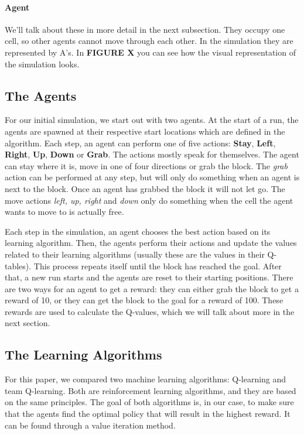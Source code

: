 \paragraph{Agent}
We'll talk about these in more detail in the next subsection. They occupy one cell, so other agents cannot move through each other. In the simulation they are represented by A's.
In \textbf{FIGURE X} you can see how the visual representation of the simulation looks.
\subsection{The Agents}
For our initial simulation, we start out with two agents. At the start of a run, the agents are spawned at their respective start locations which are defined in the algorithm. Each step, an agent can perform one of five actions: \textbf{Stay}, \textbf{Left}, \textbf{Right}, \textbf{Up}, \textbf{Down} or \textbf{Grab}. The actions mostly speak for themselves. The agent can stay where it is, move in one of four directions or grab the block. The \textit{grab} action can be performed at any step, but will only do something when an agent is next to the block. Once an agent has grabbed the block it will not let go. The move actions \textit{left, up, right} and \textit{down} only do something when the cell the agent wants to move to is actually free.

Each step in the simulation, an agent chooses the best action based on its learning algorithm. Then, the agents perform their actions and update the values related to their learning algorithms (usually these are the values in their Q-tables). This process repeats itself until the block has reached the goal. After that, a new run starts and the agents are reset to their starting positions. There are two ways for an agent to get a reward: they can either grab the block to get a reward of 10, or they can get the block to the goal for a reward of 100. These rewards are used to calculate the Q-values, which we will talk about more in the next section.

\subsection{The Learning Algorithms}
For this paper, we compared two machine learning algorithms: Q-learning and team Q-learning. Both are reinforcement learning algorithms, and they are based on the same principles. The goal of both algorithms is, in our case, to make sure that the agents find the optimal policy that will result in the highest reward. It can be found through a value iteration method.

